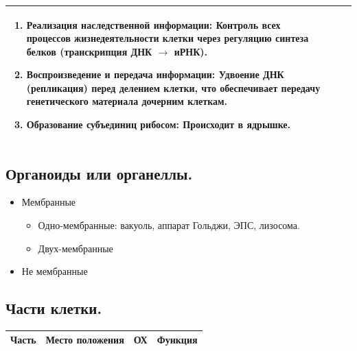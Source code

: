 \documentclass[12pt]{article}
\begin{document}
\begin{xltabular}{\textwidth}{|X|X|X|}
\begin{enumerate}
			\item Реализация наследственной информации: Контроль всех процессов жизнедеятельности клетки через регуляцию синтеза белков (транскрипция ДНК $\rightarrow$ иРНК).
			\item Воспроизведение и передача информации: Удвоение ДНК (репликация) перед делением клетки, что обеспечивает передачу генетического материала дочерним клеткам.
			\item Образование субъединиц рибосом: Происходит в ядрышке.
		\end{enumerate} \\
		\hline
	\end{xltabular}
	\subsection{Органоиды или органеллы.}
	\begin{itemize}
		\item Мембранные
		\begin{itemize}
			\item Одно-мембранные: вакуоль, аппарат Гольджи, ЭПС, лизосома.
			\item Двух-мембранные
		\end{itemize}
		\item Не мембранные
	\end{itemize}
	\subsection{Части клетки.}
	\begin{xltabular}{\textwidth}{|X|X|X|X|}
		\hline
		Часть & Место положения & ОХ & Функция \\
		\hline
	\end{xltabular}
\end{document}
